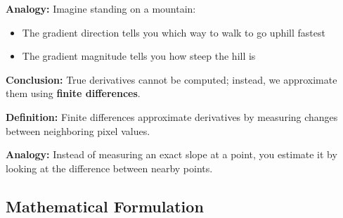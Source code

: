 \documentclass[12pt]{article}
\begin{document}
\textbf{Analogy:} Imagine standing on a mountain:
\begin{itemize}
    \item The gradient direction tells you which way to walk to go uphill fastest
    \item The gradient magnitude tells you how steep the hill is
\end{itemize}

\textbf{Conclusion:} True derivatives cannot be computed; instead, we approximate them using \textbf{finite differences}.

\textbf{Definition:} Finite differences approximate derivatives by measuring changes between neighboring pixel values.

\textbf{Analogy:} Instead of measuring an exact slope at a point, you estimate it by looking at the difference between nearby points.

\vspace{1em}

\subsection{Mathematical Formulation}
\end{document}
